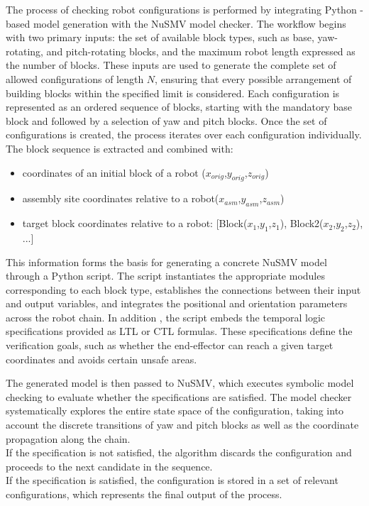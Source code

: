 The process of checking robot configurations is performed by integrating Python
-based model generation with the NuSMV model checker. The workflow begins 
with two primary inputs: the set of available block types, such as 
base, yaw-rotating, and pitch-rotating blocks, and the maximum robot length expressed as 
the number of blocks. These inputs are used to generate the complete set 
of allowed configurations of length $N$, ensuring that every possible arrangement 
of building blocks within the specified limit is considered. 
Each configuration is represented as an ordered sequence 
of blocks, starting with the mandatory base block and followed by a 
selection of yaw and pitch blocks.
Once the set of configurations is created, the process iterates over 
each configuration individually. \\
The block sequence is extracted and combined with:
\begin{itemize}
\item coordinates of an initial block of a robot ($x_{orig}$,$y_{orig}$,$z_{orig}$)
\item assembly site coordinates  relative to a robot($x_{asm}$,$y_{asm}$,$z_{asm}$)
\item target block coordinates relative to a robot:
 [Block($x_{1}$,$y_{1}$,$z_{1}$), Block2($x_{2}$,$y_{2}$,$z_{2}$), ...]
\end{itemize}
This information forms the basis for generating 
a concrete NuSMV model through a Python script. The script instantiates the 
appropriate modules corresponding to each block type, establishes the 
connections between their input and output variables, and integrates the 
positional and orientation parameters across the robot chain. In addition
, the script embeds the temporal logic specifications provided as LTL 
or CTL formulas. These specifications define the verification goals, 
such as whether the end-effector can reach a given target coordinates and 
avoids certain unsafe areas.

The generated model is then passed to NuSMV, which executes symbolic model 
checking to evaluate whether the specifications are satisfied. The model 
checker systematically explores the entire state space of the configuration, 
taking into account the discrete transitions of yaw and pitch blocks as 
well as the coordinate propagation along the chain. \\ 
If the specification is not satisfied, the algorithm discards the configuration and proceeds to 
the next candidate in the sequence. \\ 
If the specification is satisfied, 
the configuration is stored in a set of relevant configurations, which 
represents the final output of the process.

